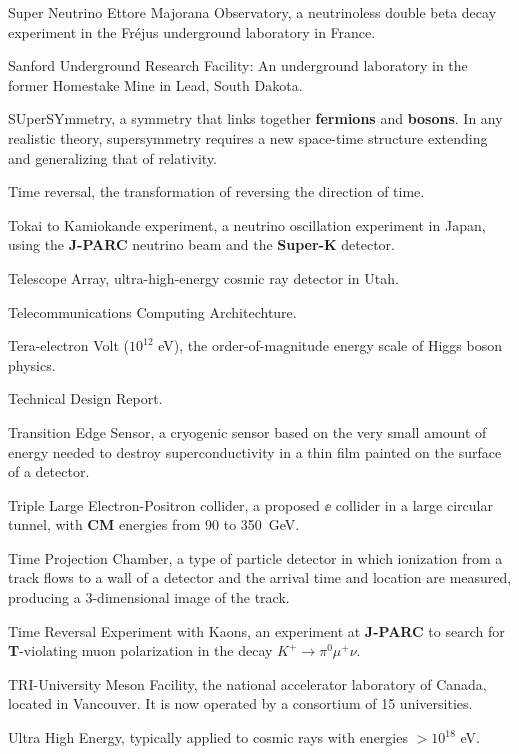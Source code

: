  Super Neutrino Ettore Majorana Observatory, a
neutrinoless double beta decay experiment in the Fr\'ejus underground
laboratory in France.

 Sanford Underground Research Facility:  An underground
laboratory in the former Homestake Mine in Lead, South Dakota.

 SUperSYmmetry, a symmetry that links together {\bf fermions}
and {\bf bosons}.  In any realistic theory, supersymmetry requires a new
space-time structure extending and generalizing that of relativity. 


 Time reversal, the transformation of reversing the
direction of time.

 Tokai to Kamiokande experiment, a neutrino oscillation
experiment in Japan, using the {\bf J-PARC} neutrino beam and the 
{\bf Super-K} detector.

  Telescope Array, ultra-high-energy cosmic ray detector in Utah.


 Telecommunications Computing Architechture.

 Tera-electron Volt ($10^{12}$ eV), the order-of-magnitude
energy scale of Higgs boson physics.

 Technical Design Report.

 Transition Edge Sensor, a cryogenic sensor based on
the very small amount of energy needed to destroy superconductivity in
a thin film painted on the surface of a detector.

 Triple Large Electron-Positron collider, a proposed $\ee$
collider in a large circular tunnel, with {\bf CM} energies from 90 to 350~GeV.

 Time Projection Chamber, a type of particle detector in which
ionization from a track flows to a wall of a detector and the arrival time
and location are measured, producing a 3-dimensional image of the
track.

   Time Reversal Experiment with Kaons, an experiment
at {\bf J-PARC} to search for {\bf T}-violating muon polarization in
the 
decay $K^+\to \pi^0 \mu^+ \nu$. 

  TRI-University Meson Facility, the national accelerator
laboratory of Canada, located in Vancouver.  It is now operated by a consortium
of 15 universities.

 Ultra High Energy, typically applied to cosmic rays with
energies $> 10^{18}$ eV.


